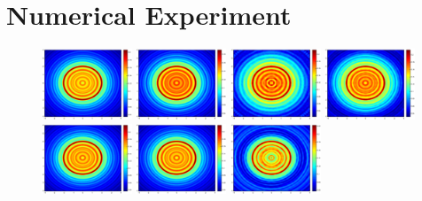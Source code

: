 \documentclass[12pt]{iopart}
\begin{document}
\section{Numerical Experiment}

\begin{figure}
	\centering
	\includegraphics[width=0.24\textwidth]{./graphic_phase/circle_r_10_k_4_vector.eps}
	\includegraphics[width=0.24\textwidth]{./graphic_phase/circle_r_10_k_4_scalar.eps}
	\includegraphics[width=0.24\textwidth]{./graphic_phase/circle_r_10_k_4_phaseless_n_128_bias_100.eps}
	\includegraphics[width=0.24\textwidth]{./graphic_phase/circle_r_10_k_4_phaseless_n_512_bias_100.eps}
	\includegraphics[width=0.24\textwidth]{./graphic_phase/circle_r_100_k_4_vector.eps}
	\includegraphics[width=0.24\textwidth]{./graphic_phase/circle_r_100_k_4_scalar.eps}
	\includegraphics[width=0.24\textwidth]{./graphic_phase/circle_r_100_k_4_phaseless_n_128_bias_100.eps}

\end{figure}
\end{document}
